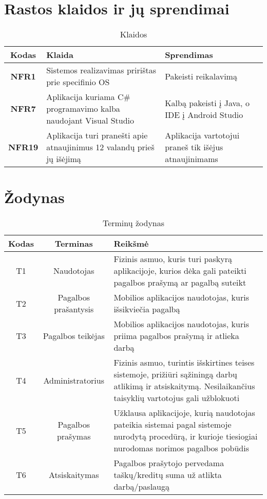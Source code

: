 \documentclass{VUMIFPSbakalaurinis}
\begin{document}
\appendix
\section{Rastos klaidos ir jų sprendimai}
\begin{table}[H]\footnotesize
	\centering
	\caption{Klaidos}
	{
	\setlength{\arrayrulewidth}{0.25mm}
	{\begin{tabular}{|c|m{5.75cm}|m{5.75cm}|} \hline
	Kodas & Klaida & Sprendimas \\
	\hline
	\textbf{NFR1} & Sistemos realizavimas pririštas prie specifinio OS & Pakeisti reikalavimą \\
	\textbf{NFR7} & Aplikacija kuriama C\# programavimo kalba naudojant Visual Studio & Kalbą pakeisti į Java, o IDE į Android Studio \\
	\textbf{NFR19} & Aplikacija turi pranešti apie atnaujinimus 12 valandų prieš jų išėjimą & Aplikacija vartotojui praneš tik išėjus atnaujinimams \\
	\hline
	\end{tabular}}
	}
	\label{tab:table example}
\end{table}

\section{Žodynas}
\begin{table}[H]\footnotesize
	\centering
	\caption{Terminų žodynas}
	{
	\setlength{\arrayrulewidth}{0.25mm}
	{\begin{tabular}{|c|c|m{11.5cm}|} \hline
	Kodas & Terminas & Reikšmė \\
	\hline
	T1 & Naudotojas & Fizinis asmuo, kuris turi paskyrą aplikacijoje, kurios dėka gali pateikti pagalbos prašymą ar pagalbą suteikt \\
	T2 & Pagalbos prašantysis & Mobilios aplikacijos naudotojas, kuris išsikviečia pagalbą \\
	T3 & Pagalbos teikėjas & Mobilios aplikacijos naudotojas, kuris  priima pagalbos prašymą ir atlieka darbą \\
	T4 & Administratorius & Fizinis asmuo, turintis išskirtines teises sistemoje, prižiūri sąžiningą darbų atlikimą ir atsiskaitymą. Nesilaikančius taisyklių vartotojus gali užblokuoti \\
	T5 & Pagalbos prašymas & Užklausa aplikacijoje, kurią naudotojas pateikia sistemai pagal sistemoje nurodytą procedūrą, ir kurioje tiesiogiai nurodomas norimos pagalbos pobūdis \\
	T6 & Atsiskaitymas & Pagalbos prašytojo pervedama taškų/kreditų suma už atlikta darbą/paslaugą \\
	\hline
	\end{tabular}}
	}
	\label{tab:table example}
\end{table}
	
\end{document}
